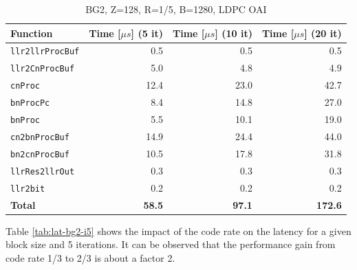 \documentclass{article}
\begin{document}
\begin{table}[ht]
  \centering
  \begin{tabular}{lrrr}
    \toprule
    \textbf{Function} & \textbf{Time [$\mu s$] (5 it)} & \textbf{Time [$\mu s$] (10 it)} & \textbf{Time [$\mu s$] (20 it)}\\
    \midrule
    \texttt{llr2llrProcBuf} & 0.5  & 0.5  & 0.5  \\
    \texttt{llr2CnProcBuf}  & 5.0  & 4.8  & 4.9  \\
    \texttt{cnProc}         & 12.4 & 23.0 & 42.7 \\
    \texttt{bnProcPc}       & 8.4  & 14.8 & 27.0 \\
    \texttt{bnProc}         & 5.5  & 10.1 & 19.0 \\
    \texttt{cn2bnProcBuf}   & 14.9 & 24.4 & 44.0 \\
    \texttt{bn2cnProcBuf}   & 10.5 & 17.8 & 31.8 \\
    \texttt{llrRes2llrOut}  & 0.3  & 0.3  & 0.3  \\
    \texttt{llr2bit}        & 0.2  & 0.2  & 0.2  \\
    \midrule
    \textbf{Total}          & \textbf{58.5} & \textbf{97.1} & \textbf{172.6} \\
    \bottomrule
  \end{tabular}
  \caption{BG2, Z=128, R=1/5, B=1280, LDPC OAI}
  \label{tab:lat-bg2-r15}
\end{table}

Table \ref{tab:lat-bg2-i5} shows the impact of the code rate on the latency for a given block size and 5 iterations. It can be observed that the performance gain from code rate 1/3 to 2/3 is about a factor 2.
\end{document}
